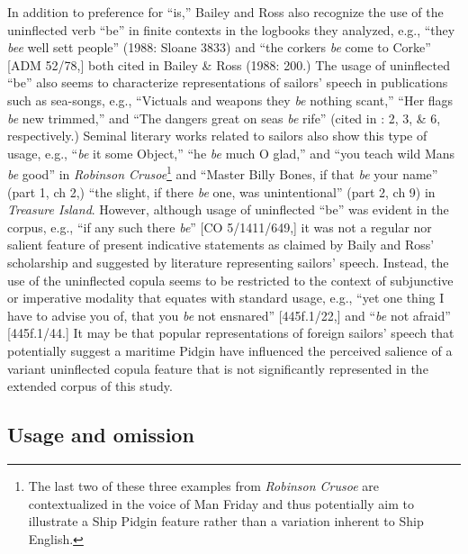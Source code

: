   In addition to preference for “is,” Bailey and Ross also recognize the use of the uninflected verb “be” in finite contexts in the logbooks they analyzed, e.g., “they \textit{bee} well sett people” (1988: Sloane 3833) and “the corkers \textit{be} come to Corke” [ADM 52/78,] both cited in Bailey \& Ross (1988: 200.) The usage of uninflected “be” also seems to characterize representations of sailors’ speech in publications such as sea-songs, e.g., “Victuals and weapons they \textit{be} nothing scant,” “Her flags \textit{be} new trimmed,” and “The dangers great on seas \textit{be} rife” (cited in \citealt{Palmer1986}: 2, 3, \& 6, respectively.) Seminal literary works related to sailors also show this type of usage, e.g., “\textit{be} it some Object,” “he \textit{be} much O glad,” and “you teach wild Mans \textit{be} good” in  \textit{Robinson Crusoe}\footnote{The last two of these three examples from \textit{Robinson Crusoe} are contextualized in the voice of Man Friday and thus potentially aim to illustrate a Ship Pidgin feature rather than a variation inherent to Ship English.}  and “Master Billy Bones, if that \textit{be} your name” (part 1, ch 2,) “the slight, if there \textit{be} one, was unintentional” (part 2, ch 9) in  \textit{Treasure Island}. However, although usage of uninflected “be” was evident in the corpus, e.g., “if any such there \textit{be}” [CO 5/1411/649,] it was not a regular nor salient feature of present indicative statements as claimed by Baily and Ross’ scholarship and suggested by literature representing sailors’ speech. Instead, the use of the uninflected copula seems to be restricted to the context of subjunctive or imperative modality that equates with standard usage, e.g., “yet one thing I have to advise you of, that you \textit{be} not ensnared” [445f.1/22,] and “\textit{be} not afraid” [445f.1/44.] It may be that popular representations of foreign sailors’ speech that potentially suggest a maritime Pidgin have influenced the perceived salience of a variant uninflected copula feature that is not significantly represented in the extended corpus of this study. 

\subsection{{Usage} {and} {omission}  }%

